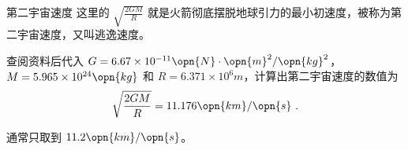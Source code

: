 \begin{example}{第二宇宙速度}
这里的 $\sqrt{\frac{2GM}{R}}$ 就是火箭彻底摆脱地球引力的最小初速度，被称为第二宇宙速度，又叫逃逸速度。

查阅资料后代入 $G=6.67\times10^{-11} \opn{N}\cdot\opn{m}^2/\opn{kg}^2$，$M=5.965\times10^{24}\opn{kg}$ 和 $R=6.371\times10^{6}m$，计算出第二宇宙速度的数值为
\begin{equation}
\sqrt{\frac{2GM}{R}}=11.176\opn{km}/\opn{s}~.
\end{equation}

通常只取到 $11.2\opn{km}/\opn{s}$。

\end{example}
















